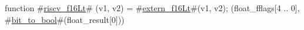 function #\hyperref[sailRISCVzriscvzyf16Lt]{riscv\_f16Lt}# (v1, v2) = {
  #\hyperref[sailRISCVzexternzyf16Lt]{extern\_f16Lt}#(v1, v2);
  (float_fflags[4 .. 0], #\hyperref[sailRISCVzbitzytozybool]{bit\_to\_bool}#(float_result[0]))
}
